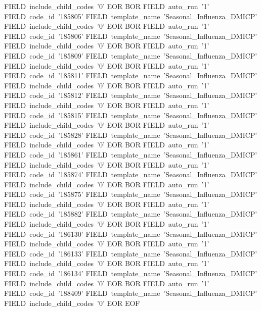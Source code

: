     FIELD~include_child_codes~'0'
  EOR
  BOR
    FIELD~auto_run~'1'
    FIELD~code_id~'185805'
    FIELD~template_name~'Seasonal_Influenza_DMICP'
    FIELD~include_child_codes~'0'
  EOR
  BOR
    FIELD~auto_run~'1'
    FIELD~code_id~'185806'
    FIELD~template_name~'Seasonal_Influenza_DMICP'
    FIELD~include_child_codes~'0'
  EOR
  BOR
    FIELD~auto_run~'1'
    FIELD~code_id~'185809'
    FIELD~template_name~'Seasonal_Influenza_DMICP'
    FIELD~include_child_codes~'0'
  EOR
  BOR
    FIELD~auto_run~'1'
    FIELD~code_id~'185811'
    FIELD~template_name~'Seasonal_Influenza_DMICP'
    FIELD~include_child_codes~'0'
  EOR
  BOR
    FIELD~auto_run~'1'
    FIELD~code_id~'185812'
    FIELD~template_name~'Seasonal_Influenza_DMICP'
    FIELD~include_child_codes~'0'
  EOR
  BOR
    FIELD~auto_run~'1'
    FIELD~code_id~'185815'
    FIELD~template_name~'Seasonal_Influenza_DMICP'
    FIELD~include_child_codes~'0'
  EOR
  BOR
    FIELD~auto_run~'1'
    FIELD~code_id~'185828'
    FIELD~template_name~'Seasonal_Influenza_DMICP'
    FIELD~include_child_codes~'0'
  EOR
  BOR
    FIELD~auto_run~'1'
    FIELD~code_id~'185861'
    FIELD~template_name~'Seasonal_Influenza_DMICP'
    FIELD~include_child_codes~'0'
  EOR
  BOR
    FIELD~auto_run~'1'
    FIELD~code_id~'185874'
    FIELD~template_name~'Seasonal_Influenza_DMICP'
    FIELD~include_child_codes~'0'
  EOR
  BOR
    FIELD~auto_run~'1'
    FIELD~code_id~'185875'
    FIELD~template_name~'Seasonal_Influenza_DMICP'
    FIELD~include_child_codes~'0'
  EOR
  BOR
    FIELD~auto_run~'1'
    FIELD~code_id~'185882'
    FIELD~template_name~'Seasonal_Influenza_DMICP'
    FIELD~include_child_codes~'0'
  EOR
  BOR
    FIELD~auto_run~'1'
    FIELD~code_id~'186130'
    FIELD~template_name~'Seasonal_Influenza_DMICP'
    FIELD~include_child_codes~'0'
  EOR
  BOR
    FIELD~auto_run~'1'
    FIELD~code_id~'186133'
    FIELD~template_name~'Seasonal_Influenza_DMICP'
    FIELD~include_child_codes~'0'
  EOR
  BOR
    FIELD~auto_run~'1'
    FIELD~code_id~'186134'
    FIELD~template_name~'Seasonal_Influenza_DMICP'
    FIELD~include_child_codes~'0'
  EOR
  BOR
    FIELD~auto_run~'1'
    FIELD~code_id~'188409'
    FIELD~template_name~'Seasonal_Influenza_DMICP'
    FIELD~include_child_codes~'0'
  EOR
EOF


